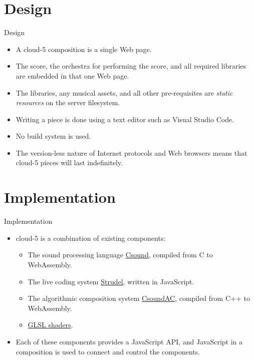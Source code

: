 \documentclass{beamer}
\begin{document}
\section{Design}

\begin{frame}{Design}
\begin{itemize}
\item A cloud-5 composition is a single Web page.
\item The score, the orchestra for performing the score, and all required libraries are embedded in that one Web page.
\item The libraries, any musical assets, and all other pre-requisites are \emph{static resources} on the server filesystem.
\item Writing a piece is done using a text editor such as Visual Studio Code.
\item No build system is used.
\item The version-less nature of Internet protocols and Web browsers means that cloud-5 pieces will last indefinitely.
\end{itemize}
\end{frame}

\section{Implementation}
\begin{frame}{Implementation}
\begin{itemize}
\item cloud-5 is a combination of existing components:
\begin{itemize}
\item The sound processing language \href{https://csound.com/}{Csound}, compiled from C to WebAssembly.
\item The live coding system \href{https://strudel.cc}{Strudel}, written in JavaScript.
\item The algorithmic composition system \href{https://github.com/gogins/csound-ac/blob/master/README.md}{CsoundAC}, compiled from C++ to WebAssembly.
\item \href{https://www.shadertoy.com/}{GLSL shaders}.
\end{itemize}
\item Each of these components provides a JavaScript API, and JavaScript in a composition is used to connect and control the components.
\end{itemize}
\end{frame}
\end{document}
